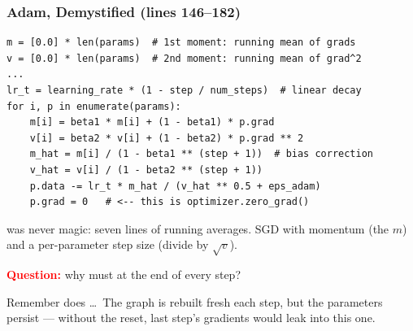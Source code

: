 \begin{frame}[fragile]
    \frametitle{Adam, Demystified (lines 146--182)}

\begin{lstlisting}
m = [0.0] * len(params)  # 1st moment: running mean of grads
v = [0.0] * len(params)  # 2nd moment: running mean of grad^2
...
lr_t = learning_rate * (1 - step / num_steps)  # linear decay
for i, p in enumerate(params):
    m[i] = beta1 * m[i] + (1 - beta1) * p.grad
    v[i] = beta2 * v[i] + (1 - beta2) * p.grad ** 2
    m_hat = m[i] / (1 - beta1 ** (step + 1))  # bias correction
    v_hat = v[i] / (1 - beta2 ** (step + 1))
    p.data -= lr_t * m_hat / (v_hat ** 0.5 + eps_adam)
    p.grad = 0   # <-- this is optimizer.zero_grad()
\end{lstlisting}

     was never magic: \alert{seven lines of running averages}. SGD with momentum (the $m$) and a per-parameter step size (divide by $\sqrt{v}$).

    \pause

    \textcolor{red}{\textbf{Question:}} why must  at the end of every step?

    \pause

    Remember  does  \dots\ The graph is rebuilt fresh each step, but the \alert{parameters persist} --- without the reset, last step's gradients would leak into this one.
\end{frame}

